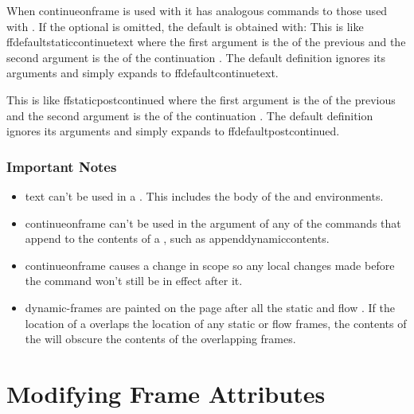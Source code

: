 \documentclass[fontsize=12pt]{scrbook}
\begin{document}
When \gls{continueonframe} is used with  it has
analogous commands to those used with .
If the optional  is omitted, the default is obtained
with:
This is like \gls{ffdefaultstaticcontinuetext} where the first argument is
the  of the previous  and the second
argument is the  of the continuation .
The default definition ignores its arguments and simply expands to
\gls{ffdefaultcontinuetext}.

This is like \gls{ffstaticpostcontinued} where the first argument is
the  of the previous  and the second
argument is the  of the continuation .
The default definition ignores its arguments and simply expands to
\gls{ffdefaultpostcontinued}.

\subsection{Important Notes}\label{sec:dynamicimportantnotes}

\begin{itemize}
\item {} text can't be used in a 
. This includes
the body of the  and  
environments.

\item \gls{continueonframe} can't be used in the
argument of any of the commands that append to the contents of a 
, such as \gls{appenddynamiccontents}.

\item \gls{continueonframe} causes a change in scope so any local
changes made before the command won't still be in effect after it.

\item \Glspl*{dynamic-frame} are painted on the page after all the
static and flow . If the location of a  
overlaps the location of any static or flow frames, the contents
of the  will obscure the contents of the overlapping
frames.
\end{itemize}

\chapter{Modifying Frame Attributes}
\label{sec:modattr}
\end{document}
